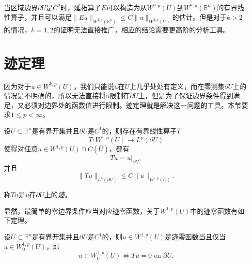 \documentclass[a4paper,10pt]{ctexart}
\begin{document}
当区域边界$ \partial U $是$ C^2 $时，延拓算子$ E $可以构造为从$ W^{2,p}(U) $到$ W^{2,p}(\mathbb{R}^n) $的有界线性算子，并且可以满足$ \| Eu \|_{W^{2,p}(\mathbb{R}^n)} \leqslant C \| u \|_{W^{2,p}(U)} $的估计。但是对于$ k > 2 $的情况，$ k=1,2 $的证明无法直接推广，相应的结论需要更高阶的分析工具。

\section{迹定理}
因为对于$ u\in W^{k,p}(U) $，我们只能说$ u $在$ U $上几乎处处有定义，而在零测集$ \partial U $上的情况是不明确的，所以无法直接将$ u $限制在$ \partial U $上，但是为了保证边界条件得到满足，又必须对边界处的函数值进行限制。迹定理就是解决这一问题的工具。本节要求$ 1\leqslant p<\infty $。
\begin{theorem}
    设$ U\subset \mathbb{R}^n $是有界开集并且$ \partial U $是$ C^1 $的，则存在有界线性算子$ T $
    \begin{equation}
        T: W^{1,p}(U) \to L^p(\partial U)
    \end{equation}
    使得对任意$ u\in W^{1,p}(U) \cap C(\overline{U}) $，都有
    \begin{equation}
        Tu = u|_{\partial U},
    \end{equation}
    并且
    \begin{equation}
        \| Tu \|_{L^p(\partial U)} \leqslant C \| u \|_{W^{1,p}(U)}.
    \end{equation}
\end{theorem}
\noindent 称$ Tu $是$ u $在$ \partial U $上的\emph{迹}。

显然，最简单的零边界条件应当对应迹零函数，关于$ W^{1,p}(U) $中的迹零函数有如下定理。
\begin{theorem}
    设$ U\subset \mathbb{R}^n $是有界开集并且$ \partial U $是$ C^1 $的，则$ u\in W^{1,p}(U) $是迹零函数当且仅当$ u\in W^{1,p}_0(U) $，即
    \begin{equation}
        u\in W^{1,p}_0(U) \iff Tu = 0 \text{ on } \partial U.
    \end{equation}
\end{theorem}
\end{document}
